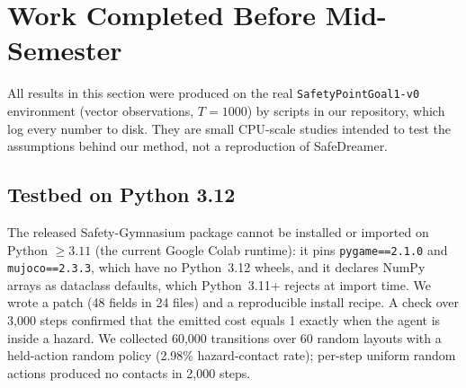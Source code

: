 %

\section{Work Completed Before Mid-Semester}

All results in this section were produced on the real \texttt{SafetyPointGoal1-v0} environment
(vector observations, $T = 1000$) by scripts in our repository, which log every number to disk.
They are small CPU-scale studies intended to test the assumptions behind our method, not a
reproduction of SafeDreamer.

\subsection{Testbed on Python 3.12}
The released Safety-Gymnasium package cannot be installed or imported on Python $\geq 3.11$
(the current Google Colab runtime): it pins \texttt{pygame==2.1.0} and \texttt{mujoco==2.3.3},
which have no Python~3.12 wheels, and it declares NumPy arrays as dataclass defaults, which
Python~3.11+ rejects at import time. We wrote a patch (48 fields in 24 files) and a reproducible
install recipe. A check over 3{,}000 steps confirmed that the emitted cost equals 1 exactly
when the agent is inside a hazard.
We collected 60{,}000 transitions over 60 random layouts with a held-action random policy
(2.98\% hazard-contact rate); per-step uniform random actions produced no contacts in 2{,}000 steps.

